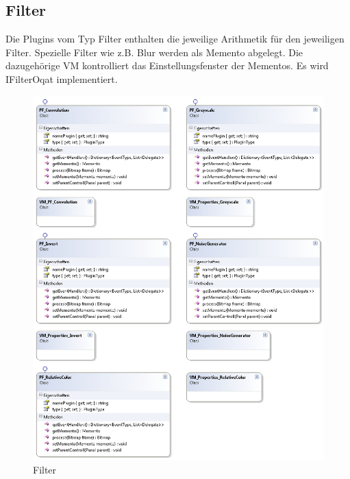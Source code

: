 \subsection{Filter}
Die Plugins vom Typ Filter enthalten die jeweilige Arithmetik für den jeweiligen Filter. Spezielle Filter wie z.B. Blur werden als Memento abgelegt. Die dazugehörige VM kontrolliert das Einstellungsfenster der Mementos. Es wird IFilterOqat  implementiert.
\begin{figure}[H]
\noindent\includegraphics[width=\linewidth,height=\textheight,
keepaspectratio]{bilder/Klassendiagramm/Plugins3.png}
\caption{Filter}
\end{figure}


\pagebreak
